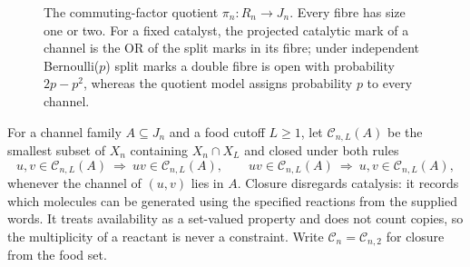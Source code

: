 \documentclass[11pt,a4paper]{article}
\theoremstyle{plain}
\theoremstyle{definition}
\theoremstyle{remark}
\newcommand{\cl}{\mathcal{C}}
\newcommand{\word}[1]{\mathtt{#1}}
\begin{document}
\begin{figure}[t]
\centering
{}
\caption{The commuting-factor quotient $\pi_n:R_n\to J_n$. Every fibre has size one or two. For a fixed catalyst, the projected catalytic mark of a channel is the OR of the split marks in its fibre; under independent Bernoulli($p$) split marks a double fibre is open with probability $2p-p^2$, whereas the quotient model assigns probability $p$ to every channel.}
\label{fig:quotient}
\end{figure}

For a channel family $A\subseteq J_n$ and a food cutoff $L\ge1$, let $\cl_{n,L}(A)$ be the smallest subset of $X_n$ containing $X_n\cap X_L$ and closed under both rules
\begin{equation}\label{eq:closure}
u,v\in\cl_{n,L}(A)\ \Longrightarrow\ uv\in\cl_{n,L}(A),\qquad
uv\in\cl_{n,L}(A)\ \Longrightarrow\ u,v\in\cl_{n,L}(A),
\end{equation}
whenever the channel of $(u,v)$ lies in $A$. Closure disregards catalysis: it records which molecules can be generated using the specified reactions from the supplied words. It treats availability as a set-valued property and does not count copies, so the multiplicity of a reactant is never a constraint. Write $\cl_n=\cl_{n,2}$ for closure from the food set.
\end{document}
